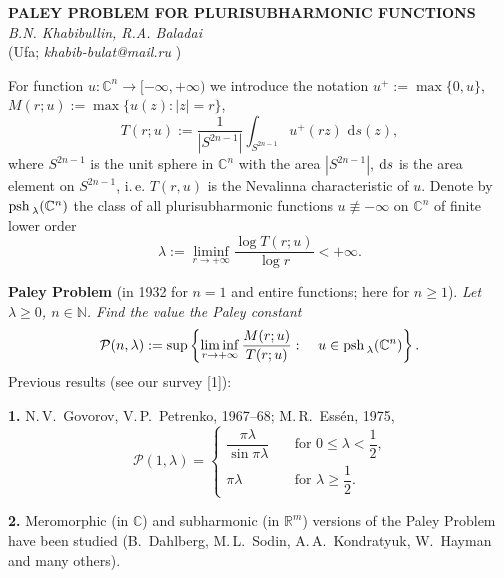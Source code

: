\begin{center}{ \bf  PALEY PROBLEM FOR PLURISUBHARMONIC FUNCTIONS}\\
{\it B.N. Khabibullin, R.A. Baladai} \\
(Ufa; {\it khabib-bulat@mail.ru} )
\end{center}

For function $u\colon {\mathbb C}^n\to [-\infty,+\infty)$ we introduce the notation  $u^+:=\max\{0, u\}$,
$M(r;u):=\max \bigl\{u(z)\colon |z|=r\bigr\}$,
\begin{equation*}
 T(r;u):=\frac{1}{|S^{2n-1}|}
\int_{S^{2n-1}} u^+ (rz)\, {\,\mathrm d} s(z),
\end{equation*}
where $S^{2n-1}$ is the unit sphere in  $\mathbb C^n$ with the area $|S^{2n-1}|$, ${\rm d}s$ is the area element on $S^{2n-1}$, i.\,e. $T(r,u)$ is the Nevalinna characteristic of $u$.
Denote by ${\rm psh\,}_{\lambda}(\mathbb C^n)$ the class of  all pluri\-sub\-ha\-r\-m\-o\-nic functions $u\not\equiv -\infty$ on $\mathbb C^n$ of finite  lower order
\begin{equation*}
 \lambda:=\liminf_{r\to +\infty}\frac{\log T(r;u)}{\log r}<+\infty .
\end{equation*}

\noindent
{\bf Paley Problem} (in 1932 for $n=1$ and entire functions; here for $n\geqslant 1$). {\it Let $\lambda \geqslant 0$, $n\in {\mathbb N}$.  Find the value the Paley constant
\begin{equation*}
\mathcal  P(n,\lambda):=\sup\left\{ \liminf_{r\to +\infty} \frac{M (r;u)}{T(r;u)}\, \colon \quad {u\in {\rm psh\,}_{\lambda}(\mathbb C^n)}\right\} .
\end{equation*}
}
Previous results (see our survey [1]):

\noindent
{\bf 1.} N.\,V.~Govorov, V.\,P.~Petrenko, 1967--68; M.\,R.~Ess\'en, 1975,
	\begin{equation*}
	\mathcal  P(1, \lambda)=\begin{cases}
	\dfrac{\pi \lambda}{\sin \pi \lambda} &\quad \text{for $0\leqslant \lambda <\dfrac{1}{2}$,}\\
	\pi \lambda &\quad \text{for $\lambda \geqslant \dfrac{1}{2}$.}
	\end{cases}
	\end{equation*}

\noindent
 {\bf 2.} Meromorphic (in ${\mathbb C}$) and subharmonic (in ${\mathbb R}^m$) versions of the Paley Problem have been studied (B.~Dahlberg, M.\,L.~Sodin,  A.\,A.~Kondratyuk, W.~Hayman and many others).

